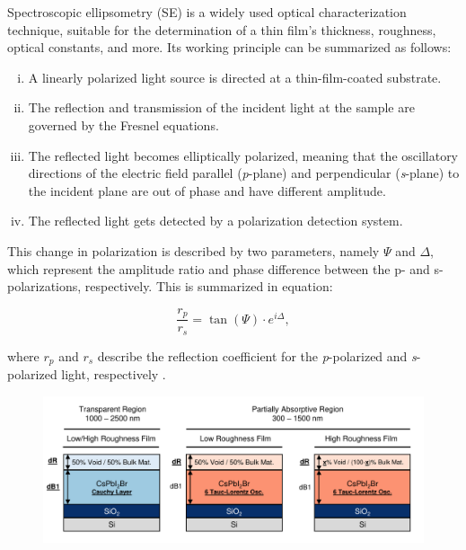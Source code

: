 Spectroscopic ellipsometry (SE) is a widely used optical characterization technique, suitable for the determination of a thin film's thickness, roughness, optical constants, and more. Its working principle can be summarized as follows: 

\begin{enumerate}[i.]
  \item A linearly polarized light source is directed at a thin-film-coated substrate.
  \item The reflection and transmission of the incident light at the sample are governed by the Fresnel equations.
  \item The reflected light becomes elliptically polarized, meaning that the oscillatory directions of the electric field parallel (\textit{p}-plane) and perpendicular (\textit{s}-plane) to the incident plane are out of phase and have different amplitude.
  \item The reflected light gets detected by a polarization detection system.
\end{enumerate}

This change in polarization is described by two parameters, namely $\Psi$ and $\Delta$, which represent the amplitude ratio and phase difference between the p- and s-polarizations, respectively. This is summarized in equation: 

\begin{equation}
\frac{r_p}{r_s} = \tan(\Psi) \cdot e^{i\Delta},
\label{eq:ellipsometry}
\end{equation}

where $r_p$ and $r_s$ describe the reflection coefficient for the \textit{p}-polarized and \textit{s}-polarized light, respectively \cite{Fujiwara2018SpectroscopicCharacterization}.

\begin{figure}{}
  \centering
  \medskip
  \includegraphics[width=.95\textwidth]{chapters/ellipsometry/image/Model_Approach.pdf}
  \caption{}
  \label{fig:ellipsometry:static_models}
\end{figure}

